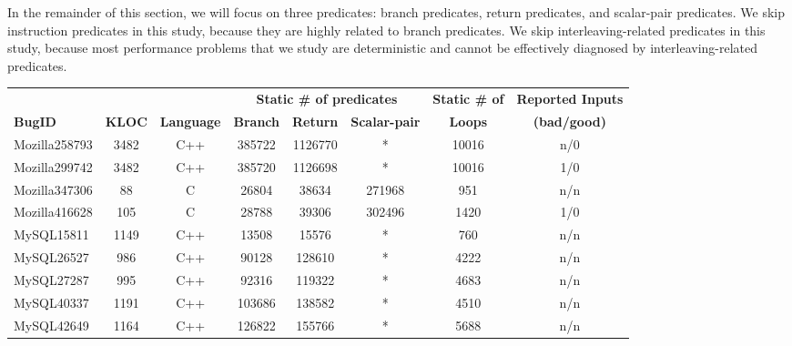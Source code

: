 In the remainder of this section, we will focus on three predicates: branch
predicates, return predicates, and scalar-pair predicates. We skip
instruction predicates in this study, because they are highly related to
branch predicates. We skip interleaving-related predicates in this study,
because most performance problems that we study are deterministic and
cannot be effectively diagnosed by interleaving-related 
predicates.

\begin{table*}
  \centering
  \small
  \newcommand{\Yes}[1]{\checkmark{}$_#1$}
  \newcommand{\No}[0]{-}
  \begin{tabular}{lccccccc}
    \toprule
              &          &         & \multicolumn{3}{c}{\bf Static \# of predicates}& {\bf Static \# of} & {\bf Reported Inputs}\\
    \cmidrule(lr){4-6}
     {\bf BugID}     &{\bf KLOC}   &{\bf Language}    &{\bf Branch}    &{\bf Return}   &{\bf Scalar-pair}   &{\bf Loops}    &{\bf (bad/good)} \\
    \midrule
    Mozilla258793    & 3482        & C++              & 385722         & 1126770       & *                & 10016         & n/0            \\
    Mozilla299742    & 3482        & C++              & 385720         & 1126698       & *                & 10016         & 1/0            \\
    Mozilla347306    & 88          & C                & 26804          & 38634         & 271968             & 951           & n/n            \\
    Mozilla416628    & 105         & C                & 28788          & 39306         & 302496             & 1420          & 1/0            \\
    \midrule
    MySQL15811       & 1149        & C++              & 13508          & 15576         & *                & 760           & n/n            \\
    MySQL26527       & 986         & C++              & 90128          & 128610        & *                & 4222          & n/n            \\
    MySQL27287       & 995         & C++              & 92316          & 119322        & *                & 4683          & n/n            \\
    MySQL40337       & 1191        & C++              & 103686         & 138582        & *                & 4510          & n/n            \\
    MySQL42649       & 1164        & C++              & 126822         & 155766        & *                & 5688          & n/n            \\

\end{tabular}
\end{table*}
